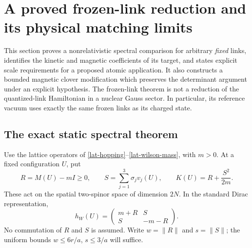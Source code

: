 \section{A proved frozen-link reduction and its physical matching limits}
\label{nr4-section}

This section proves a nonrelativistic spectral comparison for arbitrary
\emph{fixed} links, identifies the kinetic and magnetic coefficients of
its target, and states explicit scale requirements for a proposed atomic
application. It also constructs a bounded magnetic clover modification
which preserves the determinant argument under an explicit hypothesis.
The frozen-link theorem is not a reduction of the quantized-link
Hamiltonian in a nuclear Gauss sector. In particular, its reference
vacuum uses exactly the same frozen links as its charged state.

\subsection{The exact static spectral theorem}
\label{nr4-static}

Use the lattice operators of \eqref{lat-hopping}--\eqref{lat-wilson-mass},
with $m>0$. At a fixed configuration $U$, put
\[
 R=M(U)-mI\ge0,\qquad S=\sum_{j=1}^3\sigma_jv_j(U),\qquad
 K(U)=R+\frac{S^2}{2m}.
\]
These act on the spatial two-spinor space of dimension $2N$.
In the standard Dirac representation,
\begin{equation}
 h_W(U)=\begin{pmatrix}m+R&S\\S&-m-R\end{pmatrix}.
 \label{nr4-block}
\end{equation}
No commutation of $R$ and $S$ is assumed. Write $w=\|R\|$ and
$s=\|S\|$; the uniform bounds $w\le6r/a$, $s\le3/a$ will suffice.

